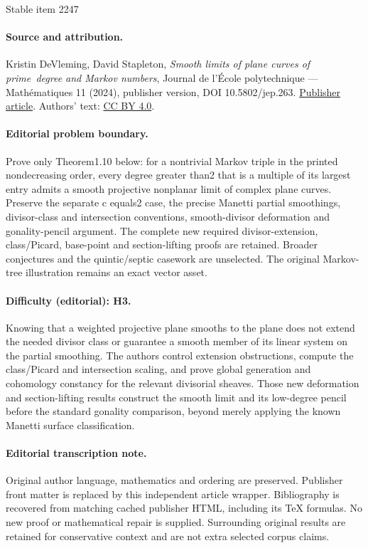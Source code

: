 \documentclass[11pt]{article}
\theoremstyle{plain}
\theoremstyle{definition}
\begin{document}
\begin{center}{\Large Stable item 2247}\end{center}
\paragraph{Source and attribution.}
Kristin DeVleming, David Stapleton, \emph{Smooth limits of plane curves of prime degree and Markov numbers}, Journal de l’École polytechnique — Mathématiques 11 (2024), publisher version, DOI 10.5802/jep.263. \href{https://jep.centre-mersenne.org/articles/10.5802/jep.263/}{Publisher article}. Authors' text: \href{https://creativecommons.org/licenses/by/4.0/}{CC BY 4.0}.
\paragraph{Editorial problem boundary.}
Prove only Theorem1.10 below: for a nontrivial Markov triple in the printed nondecreasing order, every degree greater than2 that is a multiple of its largest entry admits a smooth projective nonplanar limit of complex plane curves. Preserve the separate c equals2 case, the precise Manetti partial smoothings, divisor-class and intersection conventions, smooth-divisor deformation and gonality-pencil argument. The complete new required divisor-extension, class/Picard, base-point and section-lifting proofs are retained. Broader conjectures and the quintic/septic casework are unselected. The original Markov-tree illustration remains an exact vector asset.
\paragraph{Difficulty (editorial): H3.}
Knowing that a weighted projective plane smooths to the plane does not extend the needed divisor class or guarantee a smooth member of its linear system on the partial smoothing. The authors control extension obstructions, compute the class/Picard and intersection scaling, and prove global generation and cohomology constancy for the relevant divisorial sheaves. Those new deformation and section-lifting results construct the smooth limit and its low-degree pencil before the standard gonality comparison, beyond merely applying the known Manetti surface classification.
\paragraph{Editorial transcription note.}
Original author language, mathematics and ordering are preserved. Publisher front matter is replaced by this independent article wrapper. Bibliography is recovered from matching cached publisher HTML, including its TeX formulas. No new proof or mathematical repair is supplied. Surrounding original results are retained for conservative context and are not extra selected corpus claims.
\clearpage
\end{document}
